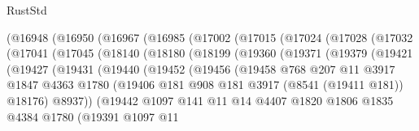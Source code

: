 \begin{lexlean}{RustStd}
\begin{coremodule}
      (@16948
        (@16950
          (@16967
            (@16985
              (@17002
                (@17015
                  (@17024
                    (@17028
                      (@17032
                        (@17041
                          (@17045
                            (@18140
                              (@18180
                                (@18199
                                  (@19360
                                    (@19371
                                      (@19379
                                        (@19421
                                          (@19427
                                            (@19431
                                              (@19440
                                                (@19452
                                                  (@19456
                                                    (@19458
                                                      @768
                                                      @207
                                                      @11
                                                      @3917
                                                      @1847
                                                      @4363
                                                      @1780
                                                      (@19406
                                                        @181
                                                        @908
                                                        @181
                                                        @3917
                                                        (@8541 (@19411 @181))
                                                        @18176)
                                                      @8937))
                                                  (@19442
                                                    @1097
                                                    @141
                                                    @11
                                                    @14
                                                    @4407
                                                    @1820
                                                    @1806
                                                    @1835
                                                    @4384
                                                    @1780
                                                    (@19391
                                                      @1097
                                                      @11

\end{coremodule}
\end{lexlean}
